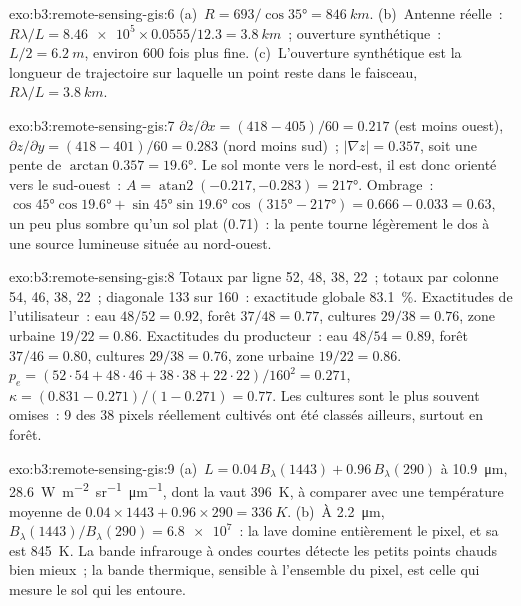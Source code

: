 \begin{solution}{exo:b3:remote-sensing-gis:6}
(a)~$R = 693/\cos\ang{35} = \qty{846}{km}$. (b)~Antenne réelle~: $R\lambda/L =
\num{8.46e5}\times0.0555/12.3 = \qty{3.8}{km}$~; ouverture synthétique~: $L/2 =
\qty{6.2}{m}$, environ 600 fois plus fine. (c)~L'ouverture synthétique est la
longueur de trajectoire sur laquelle un point reste dans le faisceau, $R\lambda/L =
\qty{3.8}{km}$.
\end{solution}

\begin{solution}{exo:b3:remote-sensing-gis:7}
$\partial z/\partial x = (418 - 405)/60 = 0.217$ (est moins ouest),
$\partial z/\partial y = (418 - 401)/60 = 0.283$ (nord moins sud)~;
$|\nabla z| = 0.357$, soit une pente de $\arctan 0.357 = \ang{19.6}$. Le sol
monte vers le nord-est, il est donc orienté vers le sud-ouest~: $A =
\operatorname{atan2}(-0.217, -0.283) = \ang{217}$. Ombrage~: $\cos\ang{45}
\cos\ang{19.6} + \sin\ang{45}\sin\ang{19.6}\cos(\ang{315} - \ang{217}) =
0.666 - 0.033 = 0.63$, un peu plus sombre qu'un sol plat (0.71)~: la pente
tourne légèrement le dos à une source lumineuse située au nord-ouest.
\end{solution}

\begin{solution}{exo:b3:remote-sensing-gis:8}
Totaux par ligne 52, 48, 38, 22~; totaux par colonne 54, 46, 38, 22~; diagonale 133 sur
160~: exactitude globale \qty{83.1}{\percent}. Exactitudes de l'utilisateur~: eau
$48/52 = 0.92$, forêt $37/48 = 0.77$, cultures $29/38 = 0.76$, zone urbaine
$19/22 = 0.86$. Exactitudes du producteur~: eau $48/54 = 0.89$, forêt $37/46 = 0.80$,
cultures $29/38 = 0.76$, zone urbaine $19/22 = 0.86$. $p_e = (52\cdot54 + 48\cdot46 +
38\cdot38 + 22\cdot22)/160^2 = 0.271$, $\kappa = (0.831 - 0.271)/(1 -
0.271) = 0.77$. Les cultures sont le plus souvent omises~: 9 des 38 pixels réellement cultivés
ont été classés ailleurs, surtout en forêt.
\end{solution}

\begin{solution}{exo:b3:remote-sensing-gis:9}
(a)~$L = 0.04\,B_\lambda(1443) + 0.96\,B_\lambda(290)$ à
\qty{10.9}{\micro\metre}, \qty{28.6}{W.m^{-2}.sr^{-1}.\micro\metre^{-1}},
dont la  vaut \qty{396}{K}, à comparer avec une température moyenne de
$0.04\times1443 + 0.96\times290 = \qty{336}{K}$. (b)~À
\qty{2.2}{\micro\metre}, $B_\lambda(1443)/B_\lambda(290) = \num{6.8e7}$~:
la lave domine entièrement le pixel, et sa  est
\qty{845}{K}. La bande infrarouge à ondes courtes détecte les petits points chauds
bien mieux~; la bande thermique, sensible à l'ensemble du pixel, est celle qui
mesure le sol qui les entoure.
\end{solution}

